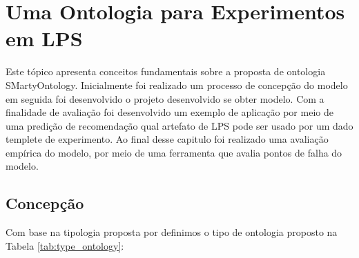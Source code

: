 \chapter{Uma Ontologia para Experimentos em LPS}
\label{sec:ontologia}

Este tópico apresenta conceitos fundamentais sobre a proposta de ontologia SMartyOntology. Inicialmente foi realizado um processo de concepção do modelo em seguida foi desenvolvido o projeto desenvolvido se obter modelo. Com a finalidade de avaliação foi desenvolvido um exemplo de aplicação por meio de uma predição de recomendação qual artefato de LPS pode ser usado por um dado templete de experimento. Ao final desse capitulo foi realizado uma avaliação empírica do modelo, por meio de uma ferramenta que avalia pontos de falha do modelo.

\section{Concepção}
\label{sec:concepcao}

Com base na tipologia proposta por \cite{almeida2003visao} definimos o tipo de ontologia proposto na Tabela \ref{tab:type_ontology}:

